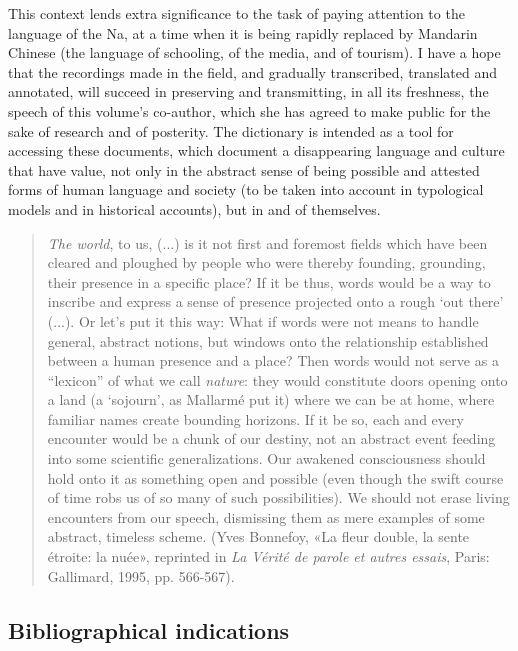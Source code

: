 This context lends extra significance to the task of paying attention to the language of the Na, at a time when it is being rapidly replaced by Mandarin Chinese (the language of schooling, of the media, and of tourism). I have a hope that the recordings made in the field, and gradually transcribed, translated and annotated, will succeed in preserving and transmitting, in all its freshness, the speech of this volume's co-author, which she has agreed to make public for the sake of research and of posterity. The dictionary is intended as a tool for accessing these documents, which document a disappearing language and culture that have value, not only in the abstract sense of being possible and attested forms of human language and society (to be taken into account in typological models and in historical accounts), but in and of themselves.

	\begin{quote}
    \emph{The world}, to us, (...) is it not first and foremost fields which have been cleared and ploughed by people who were thereby founding, grounding, their presence in a specific place? If it be thus, words would be a way to inscribe and express a sense of presence projected onto a rough `out there' (...). Or let's put it this way: What if words were not means to handle general, abstract notions, but windows onto the relationship established between a human presence and a place? Then words would not serve as a ``lexicon'' of what we call \emph{nature}: they would constitute doors opening onto a land (a `sojourn', as Mallarmé put it) where we can be at home, where familiar names create bounding horizons. If it be so, each and every encounter would be a chunk of our destiny, not an abstract event feeding into some scientific generalizations. Our awakened consciousness should hold onto it as something open and possible (even though the swift course of time robs us of so many of such possibilities). We should not erase living encounters from our speech, dismissing them as mere examples of some abstract, timeless scheme. (Yves Bonnefoy, «La fleur double, la sente étroite: la nuée», reprinted in \emph{La Vérité de parole et autres essais}, Paris: Gallimard, 1995, pp. 566-567).
\end{quote}

\subsection*{Bibliographical indications}

